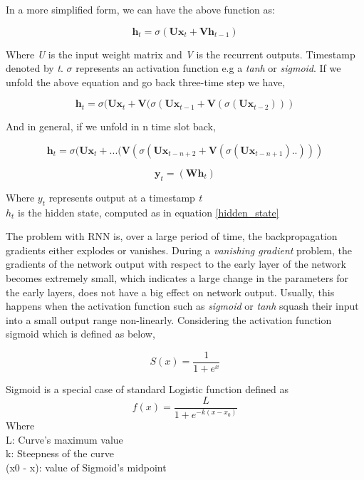In a more simplified form, we can have the above function as:

\begin{equation}\label{hidden_state}
	\textbf{h}_t = \sigma (\textbf{Ux}_t + \textbf{Vh}_{t-1}) 
\end{equation}

Where \textit{U} is the input weight matrix and \textit{V} is the recurrent outputs. Timestamp denoted by \textit{t}. $\sigma$ represents an activation function e.g a \textit{tanh} or \textit{sigmoid}. If we unfold the above equation and go back three-time step we have,

\begin{equation}
	\textbf{h}_t = \sigma (\textbf{Ux}_t + \textbf{V}(\sigma(\textbf{Ux}_{t-1} + \textbf{V}(\sigma(\textbf{Ux}_{t-2})))
\end{equation}

And in general, if we unfold in n time slot back,

\begin{equation}
\textbf{h}_t = \sigma (\textbf{Ux}_t + ...( \textbf{V}(\sigma(\textbf{Ux}_{t-n+2} + \textbf{V}(\sigma(\textbf{Ux}_{t-n+1})..)))
\end{equation}

\begin{equation}
	\textbf{y}_t = (\textbf{W}  \textbf{h}_{t}) 
\end{equation}

Where \textbf{$y_t$}  represents output at a timestamp \textit{t} \\
\textbf{$h_t$} is the hidden state, computed as in equation \ref{hidden_state}

The problem with RNN is, over a large period of time, the backpropagation gradients either explodes or vanishes. During a \textit{vanishing gradient } problem, the gradients of the network output with respect to the early layer of the network becomes extremely small, which indicates a large change in the parameters for the early layers, does not have a big effect on network output. Usually, this happens when the activation function such as \textit{sigmoid} or \textit{tanh} squash their input into a small output range non-linearly. Considering the activation function sigmoid which is defined as below,

\begin{equation}
	S(x) = \frac{1}{ 1+ e^x}
\end{equation}

Sigmoid is a special case of standard Logistic function defined as 
\begin{equation}
f(x) = \frac{L}{ 1+ e^{-k(x-x_0)}}
\end{equation}
Where \\
L: Curve's maximum value \\
k: Steepness of the curve \\
(x0 - x): value of Sigmoid's midpoint \\

